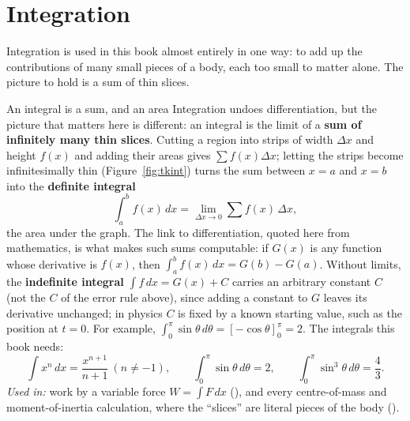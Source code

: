 \section{Integration}\label{sec:integration}

Integration is used in this book almost entirely in one way: to add up the contributions of many small
pieces of a body, each too small to matter alone. The picture to hold is a sum of thin slices.

\begin{defbox}{An integral is a sum, and an area}
Integration undoes differentiation, but the picture that matters here is different: an integral is the
limit of a \textbf{sum of infinitely many thin slices}. Cutting a region into strips of width $\Delta x$
and height $f(x)$ and adding their areas gives $\sum f(x)\Delta x$; letting the strips become
infinitesimally thin (Figure~\ref{fig:tkint}) turns the sum between $x=a$ and $x=b$ into the \textbf{definite integral}
\[
\int_a^b f(x)\,dx=\lim_{\Delta x\to0}\sum f(x)\,\Delta x,
\]
the area under the graph. The link to differentiation, quoted here from mathematics, is what makes such
sums computable: if $G(x)$ is any function whose derivative is $f(x)$, then
$\int_a^b f(x)\,dx=G(b)-G(a)$. Without limits, the \textbf{indefinite integral} $\int f\,dx=G(x)+C$
carries an arbitrary constant $C$ (not the $C$ of the error rule above), since adding a constant to $G$ leaves its derivative unchanged; in
physics $C$ is fixed by a known starting value, such as the position at $t=0$. For example, $\int_0^{\pi}\sin\theta\,d\theta=[-\cos\theta]_0^{\pi}=2$.
The integrals this book needs:
\[
\int x^{n}\,dx=\frac{x^{n+1}}{n+1}\ (n\neq-1),\qquad
\int_0^{\pi}\sin\theta\,d\theta=2,\qquad
\int_0^{\pi}\sin^{3}\theta\,d\theta=\frac{4}{3}.
\]
\emph{Used in:} work by a variable force $W=\int F\,dx$ (), and every centre-of-mass and
moment-of-inertia calculation, where the ``slices'' are literal pieces of the body
().
\end{defbox}

\begin{figure}[htbp]
\centering
{}
\end{figure}

